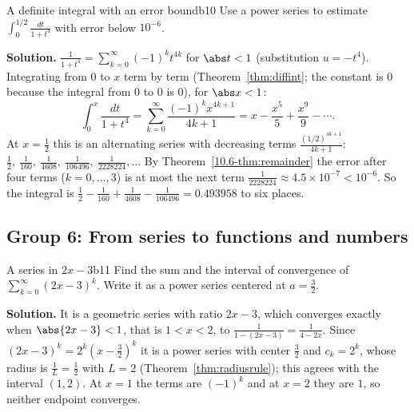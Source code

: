 \documentclass[11pt]{article}
\begin{document}
\begin{exmp}{A definite integral with an error bound}{b10}
Use a power series to estimate $\displaystyle\int_0^{1/2}\frac{dt}{1+t^4}$ with error below $10^{-6}$.

\textbf{Solution.} $\frac1{1+t^4}=\sum_{k=0}^\infty(-1)^kt^{4k}$ for $\abs t<1$ (substitution $u=-t^4$). Integrating from $0$ to $x$ term by term (Theorem~\ref{thm:diffint}; the constant is $0$ because the integral from $0$ to $0$ is $0$), for $\abs x<1$:
\[
\int_0^x\frac{dt}{1+t^4}=\sum_{k=0}^\infty\frac{(-1)^kx^{4k+1}}{4k+1}=x-\frac{x^5}5+\frac{x^9}9-\cdots .
\]
At $x=\frac12$ this is an alternating series with decreasing terms $\frac{(1/2)^{4k+1}}{4k+1}$: $\frac12,\ \frac1{160},\ \frac1{4608},\ \frac1{106496},\ \frac1{2228224},\dots$ By Theorem~\ref{10.6-thm:remainder} the error after four terms ($k=0,\dots,3$) is at most the next term $\frac1{2228224}\approx4.5\times10^{-7}<10^{-6}$. So the integral is $\frac12-\frac1{160}+\frac1{4608}-\frac1{106496}=0.493958$ to six places.
\end{exmp}

\subsection*{Group 6: From series to functions and numbers}

\begin{exmp}{A series in $2x-3$}{b11}
Find the sum and the interval of convergence of $\displaystyle\sum_{k=0}^\infty(2x-3)^k$. Write it as a power series centered at $a=\frac32$.

\textbf{Solution.} It is a geometric series with ratio $2x-3$, which converges exactly when $\abs{2x-3}<1$, that is $1<x<2$, to $\frac1{1-(2x-3)}=\frac1{4-2x}$. Since $(2x-3)^k=2^k\left(x-\frac32\right)^k$ it is a power series with center $\frac32$ and $c_k=2^k$, whose radius is $\frac1L=\frac12$ with $L=2$ (Theorem~\ref{thm:radiusrule}); this agrees with the interval $(1,2)$. At $x=1$ the terms are $(-1)^k$ and at $x=2$ they are $1$, so neither endpoint converges.
\end{exmp}
\end{document}
